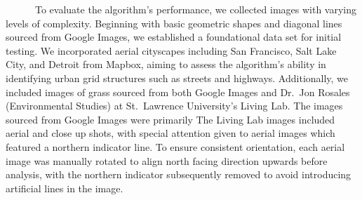 \documentclass[
  letterpaper,
  DIV=11,
  numbers=noendperiod]{scrreprt}
\begin{document}
~~~~~~To evaluate the algorithm's performance, we collected images with
varying levels of complexity. Beginning with basic geometric shapes and
diagonal lines sourced from Google Images, we established a foundational
data set for initial testing. We incorporated aerial cityscapes
including San Francisco, Salt Lake City, and Detroit from Mapbox, aiming
to assess the algorithm's ability in identifying urban grid structures
such as streets and highways. Additionally, we included images of grass
sourced from both Google Images and Dr.~Jon Rosales (Environmental
Studies) at St.~Lawrence University's Living Lab. The images sourced
from Google Images were primarily The Living Lab images included aerial
and close up shots, with special attention given to aerial images which
featured a northern indicator line. To ensure consistent orientation,
each aerial image was manually rotated to align north facing direction
upwards before analysis, with the northern indicator subsequently
removed to avoid introducing artificial lines in the image.
\end{document}
